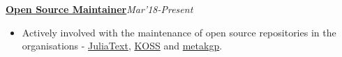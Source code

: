 \documentclass[a4paper,10pt]{extarticle} %
\begin{document}
\textbf{\href{https://github.com/Ayushk4}{Open Source Maintainer}}\hfill\textit{\small{Mar'18-Present}}
    \begin{itemize}[leftmargin=.15in]
        \item Actively involved with the maintenance of open source repositories in the organisations - \href{https://github.com/JuliaText}{JuliaText}, \href{https://github.com/kossiitkgp}{KOSS} and \href{https://github.com/metakgp}{metakgp}.
    \end{itemize}
\textbf{ }


\end{document}
